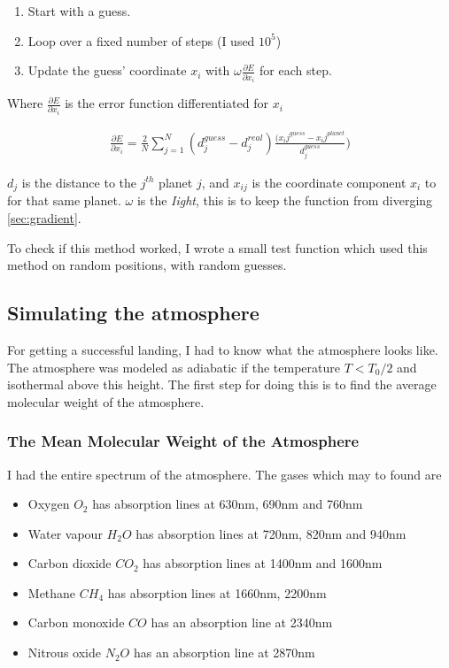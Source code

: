 \documentclass[a4paper, 10pt]{article}
\begin{document}
\begin{enumerate}
\item Start with a guess.
\item Loop over a fixed number of steps (I used $10^{5}$)
\item Update the guess' coordinate $x_i$ with $\omega \frac{\partial E}{\partial x_i}$ for each step.
\end{enumerate}

Where $\frac{\partial E}{\partial x_i}$ is the error function differentiated for $x_i$

\begin{align}\label{eq:gradient}
\frac{\partial E}{\partial x_i} = \frac{2}{N}\sum_{j=1}^N (d_j^{guess} - d_j^{real})\frac{(x_ij^{guess} - x_ij^{planet}}{d_j^{guess}})
\end{align}

$d_j$ is the distance to the $j^{th}$ planet $j$, and $x_{ij}$ is the coordinate component $x_i$ to for that same planet. $\omega$ is the \textit{Iight}, this is to keep the function from diverging \ref{sec:gradient}.

To check if this method worked, I wrote a small test function which used this method on random positions, with random guesses.




\subsection{Simulating the atmosphere}

For getting a successful landing, I had to know what the atmosphere looks like. The atmosphere was modeled as adiabatic if the temperature $T < T_0/2$ and isothermal above this height. The first step for doing this is to find the average molecular weight of the atmosphere.

\subsubsection{The Mean Molecular Weight of the Atmosphere}

I had the entire spectrum of the atmosphere. The gases which may to found are

\begin{itemize}
\item Oxygen  $O_2$ has  absorption  lines  at  630nm,
690nm and 760nm
\item Water  vapour  $H_2O$  has  absorption  lines  at
720nm,  820nm  and  940nm
\item Carbon dioxide $CO_2$ has absorption lines at
1400nm and 1600nm
\item Methane $CH_4$ has   absorption   lines   at
1660nm,  2200nm
\item Carbon monoxide $CO$ has an absorption line
at 2340nm
\item Nitrous oxide $N_2O$ has  an  absorption  line  at  2870nm
\end{itemize}
\end{document}
